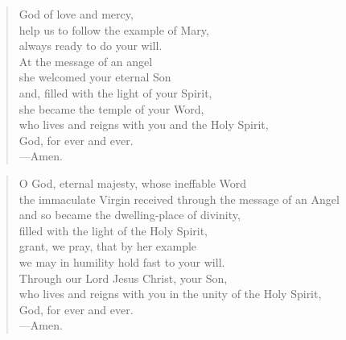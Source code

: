 \prayer

\setlength{\vleftmargin}{\prayerleftmargini}

\begin{verse}
God of love and mercy,\\
help us to follow the example of Mary,\\
always ready to do your will.\\
At the message of an angel\\
she welcomed your eternal Son\\
and, filled with the light of your Spirit,\\
she became the temple of your Word,\\
who lives and reigns with you and the Holy Spirit,\\
God, for ever and ever.\\
{\color{red}---\thinspace}Amen.
\end{verse}


\begin{verse}
O God, eternal majesty, whose ineffable Word\\
the immaculate Virgin received through the message of an Angel\\
and so became the dwelling-place of divinity,\\
filled with the light of the Holy Spirit,\\
grant, we pray, that by her example\\
we may in humility hold fast to your will.\\
Through our Lord Jesus Christ, your Son,\\
who lives and reigns with you in the unity of the Holy Spirit,\\
God, for ever and ever.\\
{\color{red}---\thinspace}Amen.

\end{verse}

\setlength{\vleftmargin}{\defleftmargini}